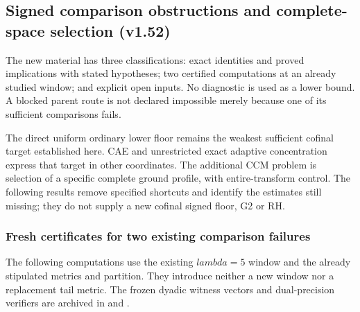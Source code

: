 \documentclass[11pt]{article}
\def\lambda{lambda}%
\theoremstyle{remark}
\begin{document}
\subsection{Signed comparison obstructions and complete-space selection (v1.52)}
\label{sec:v152-route-selection}
The new material has three classifications: exact identities and proved
implications with stated hypotheses; two certified computations at an
already studied window; and explicit open inputs. No diagnostic is used
as a lower bound. A blocked parent route is not declared impossible
merely because one of its sufficient comparisons fails.

The direct uniform ordinary lower floor remains the weakest sufficient
cofinal target established here. CAE and unrestricted exact adaptive
concentration express that target in other coordinates. The additional
CCM problem is selection of a specific complete ground profile, with
entire-transform control. The following results remove specified
shortcuts and identify the estimates still missing; they do not supply
a new cofinal signed floor, G2 or RH.



\subsubsection*{Fresh certificates for two existing comparison failures}

The following computations use the existing $\lambda=5$ window and
the already stipulated metrics and partition. They introduce neither a
new window nor a replacement tail metric. The frozen dyadic witness vectors and dual-precision verifiers are archived in  and .
\end{document}
